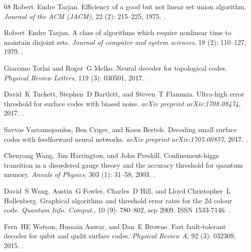 \documentclass[a4paper, 10pt, accepted=2021-11-03]{quantumarticle}
\begin{document}
{\begin{thebibliography}{68}
Robert~Endre Tarjan.
\newblock Efficiency of a good but not linear set union algorithm.
\newblock \emph{Journal of the ACM (JACM)}, 22 (2): 215--225,
  1975.
\newblock {}.

Robert~Endre Tarjan.
\newblock A class of algorithms which require nonlinear time to maintain
  disjoint sets.
\newblock \emph{Journal of computer and system sciences}, 18
  (2): 110--127, 1979.
\newblock {}.

Giacomo Torlai and Roger~G Melko.
\newblock Neural decoder for topological codes.
\newblock \emph{Physical Review Letters}, 119 (3): 030501,
  2017.
\newblock {}.

David~K Tuckett, Stephen~D Bartlett, and Steven~T Flammia.
\newblock Ultra-high error threshold for surface codes with biased noise.
\newblock \emph{arXiv preprint arXiv:1708.08474}, 2017.
\newblock {}.

Savvas Varsamopoulos, Ben Criger, and Koen Bertels.
\newblock Decoding small surface codes with feedforward neural networks.
\newblock \emph{arXiv preprint arXiv:1705.00857}, 2017.
\newblock {}.

Chenyang Wang, Jim Harrington, and John Preskill.
\newblock Confinement-higgs transition in a disordered gauge theory and the
  accuracy threshold for quantum memory.
\newblock \emph{Annals of Physics}, 303 (1): 31--58, 2003.
\newblock {}.

David~S Wang, Austin~G Fowler, Charles~D Hill, and Lloyd Christopher~L
  Hollenberg.
\newblock Graphical algorithms and threshold error rates for the 2d colour
  code.
\newblock \emph{Quantum Info. Comput.}, 10 (9): 780–802,
  sep 2009.
\newblock ISSN 1533-7146.
\newblock {}.

Fern~HE Watson, Hussain Anwar, and Dan~E Browne.
\newblock Fast fault-tolerant decoder for qubit and qudit surface codes.
\newblock \emph{Physical Review A}, 92 (3): 032309, 2015.
\newblock {}.


\end{thebibliography}}
\end{document}
